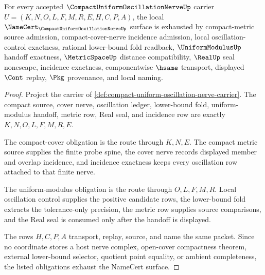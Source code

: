 \begin{theorem}
\label{thm:compact-uniform-oscillation-nerve-namecert-obligations}
For every accepted $\CompactUniformOscillationNerveUp$ carrier $U=(K,N,O,L,F,M,R,E,H,C,P,A)$, the local $\NameCert_{\CompactUniformOscillationNerveUp}$ surface is exhausted by compact-metric source admission, compact-cover-nerve incidence admission, local oscillation-control exactness, rational lower-bound fold readback, $\UniformModulusUp$ handoff exactness, $\MetricSpaceUp$ distance compatibility, $\RealUp$ seal nonescape, incidence exactness, componentwise $\hsame$ transport, displayed $\Cont$ replay, $\Pkg$ provenance, and local naming.
\end{theorem}
\begin{proof}
Project the carrier of \autoref{def:compact-uniform-oscillation-nerve-carrier}. The compact source, cover nerve, oscillation ledger, lower-bound fold, uniform-modulus handoff, metric row, Real seal, and incidence row are exactly $K,N,O,L,F,M,R,E$.

The compact-cover obligation is the route through $K,N,E$. The compact metric source supplies the finite probe spine, the cover nerve records displayed member and overlap incidence, and incidence exactness keeps every oscillation row attached to that finite nerve.

The uniform-modulus obligation is the route through $O,L,F,M,R$. Local oscillation control supplies the positive candidate rows, the lower-bound fold extracts the tolerance-only precision, the metric row supplies source comparisons, and the Real seal is consumed only after the handoff is displayed.

The rows $H,C,P,A$ transport, replay, source, and name the same packet. Since no coordinate stores a host nerve complex, open-cover compactness theorem, external lower-bound selector, quotient point equality, or ambient completeness, the listed obligations exhaust the NameCert surface.
\end{proof}


